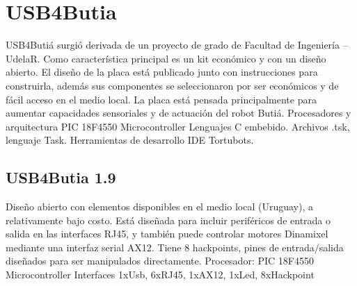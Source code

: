 
\section{USB4Butia}

USB4Butiá surgió derivada de un proyecto de grado de Facultad de Ingeniería – UdelaR. Como característica principal es un kit económico y con un diseño abierto.
El diseño de la placa está publicado junto con instrucciones para construirla, además sus componentes se seleccionaron por ser económicos y de fácil acceso en el medio local.
La placa está pensada principalmente para aumentar capacidades sensoriales y de actuación del robot Butiá.
Procesadores y arquitectura
  PIC 18F4550 Microcontroller
Lenguajes
  C embebido. Archivos .tsk, lenguaje Task.
Herramientas de desarrollo
  IDE Tortubots.

\subsection{USB4Butia 1.9}
Diseño abierto con elementos disponibles en el medio local (Uruguay), a relativamente bajo costo.
Está diseñada para incluir periféricos de entrada o salida en las interfaces RJ45, y también puede controlar motores Dinamixel mediante una interfaz serial AX12.
Tiene 8 hackpoints, pines de entrada/salida diseñados para ser manipulados directamente.
Procesador:
PIC 18F4550 Microcontroller
Interfaces
1xUsb, 6xRJ45, 1xAX12, 1xLed, 8xHackpoint



